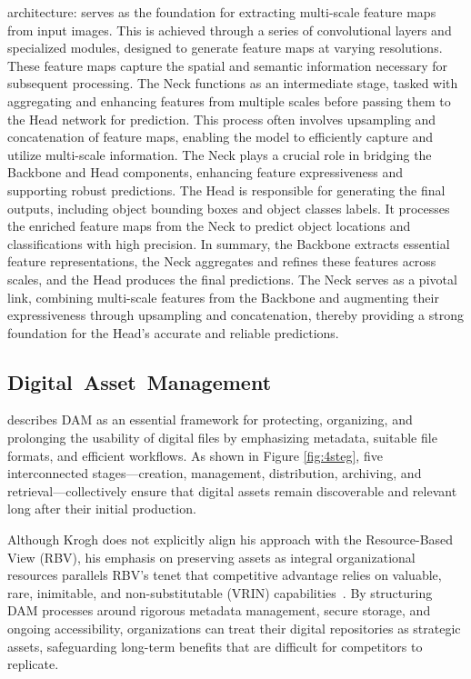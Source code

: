 \documentclass[a4paper,10pt,twocolumn]{article}
\numberwithin{figure}{section}
\numberwithin{table}{section}
\begin{document}
architecture:
serves as the foundation for extracting multi-scale feature
maps from input images. This is achieved through a series
of convolutional layers and specialized modules, designed to
generate feature maps at varying resolutions. These feature
maps capture the spatial and semantic information necessary for subsequent processing. The Neck functions as an
intermediate stage, tasked with aggregating and enhancing
features from multiple scales before passing them to the Head
network for prediction. This process often involves upsampling
and concatenation of feature maps, enabling the model to
efficiently capture and utilize multi-scale information. The
Neck plays a crucial role in bridging the Backbone and Head
components, enhancing feature expressiveness and supporting
robust predictions. The Head is responsible for generating the
final outputs, including object bounding boxes and object classes
labels. It processes the enriched feature maps from the Neck to
predict object locations and classifications with high precision.
In summary, the Backbone extracts essential feature representations, the Neck aggregates and refines these features
across scales, and the Head produces the final predictions.
The Neck serves as a pivotal link, combining multi-scale
features from the Backbone and augmenting their expressiveness through upsampling and concatenation, thereby providing
a strong foundation for the Head’s accurate and reliable
predictions.

\subsection{\mbox{Digital Asset Management}}
\cite{krogh2009} describes DAM as an essential framework for protecting, 
organizing, and prolonging the usability of digital files by emphasizing 
metadata, suitable file formats, and efficient workflows. As shown in Figure \ref{fig:4steg}, 
five interconnected stages—creation, management, distribution, archiving, and retrieval—collectively 
ensure that digital assets remain discoverable and relevant long after their initial production.

Although Krogh does not explicitly align his approach with the Resource-Based View (RBV), 
his emphasis on preserving assets as integral organizational resources parallels RBV’s 
tenet that competitive advantage relies on valuable, rare, inimitable, and non-substitutable 
(VRIN) capabilities \citep{barney1991}. By structuring DAM processes around rigorous 
metadata management, secure storage, and ongoing accessibility, organizations can treat 
their digital repositories as strategic assets, safeguarding long-term benefits that are 
difficult for competitors to replicate.
\end{document}
